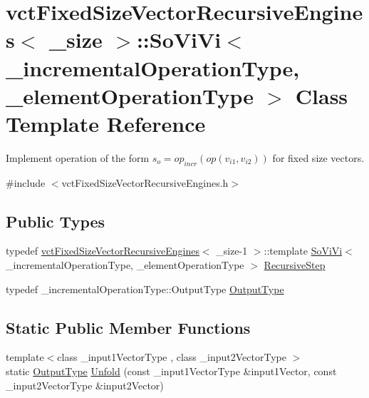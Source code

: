 \hypertarget{classvct_fixed_size_vector_recursive_engines_1_1_so_vi_vi}{}\section{vct\+Fixed\+Size\+Vector\+Recursive\+Engines$<$ \+\_\+size $>$\+:\+:So\+Vi\+Vi$<$ \+\_\+incremental\+Operation\+Type, \+\_\+element\+Operation\+Type $>$ Class Template Reference}
\label{classvct_fixed_size_vector_recursive_engines_1_1_so_vi_vi}


Implement operation of the form $s_o = op_{incr}(op(v_{i1}, v_{i2}))$ for fixed size vectors.  




{\ttfamily \#include $<$vct\+Fixed\+Size\+Vector\+Recursive\+Engines.\+h$>$}

\subsection*{Public Types}
\begin{DoxyCompactItemize}
\item 
typedef \hyperlink{classvct_fixed_size_vector_recursive_engines}{vct\+Fixed\+Size\+Vector\+Recursive\+Engines}$<$ \+\_\+size-\/1 $>$\+::template \hyperlink{classvct_fixed_size_vector_recursive_engines_1_1_so_vi_vi}{So\+Vi\+Vi}$<$ \+\_\+incremental\+Operation\+Type, \+\_\+element\+Operation\+Type $>$ \hyperlink{classvct_fixed_size_vector_recursive_engines_1_1_so_vi_vi_a75d4db74016f41d3bd1888e53f95f819}{Recursive\+Step}
\item 
typedef \+\_\+incremental\+Operation\+Type\+::\+Output\+Type \hyperlink{classvct_fixed_size_vector_recursive_engines_1_1_so_vi_vi_a6d0b7f027e001b57489dcc1314ea016e}{Output\+Type}
\end{DoxyCompactItemize}
\subsection*{Static Public Member Functions}
\begin{DoxyCompactItemize}
\item 
{\footnotesize template$<$class \+\_\+input1\+Vector\+Type , class \+\_\+input2\+Vector\+Type $>$ }\\static \hyperlink{classvct_fixed_size_vector_recursive_engines_1_1_so_vi_vi_a6d0b7f027e001b57489dcc1314ea016e}{Output\+Type} \hyperlink{classvct_fixed_size_vector_recursive_engines_1_1_so_vi_vi_a0703aa041b0662462569c1a70b7ceff9}{Unfold} (const \+\_\+input1\+Vector\+Type \&input1\+Vector, const \+\_\+input2\+Vector\+Type \&input2\+Vector)
\end{DoxyCompactItemize}


